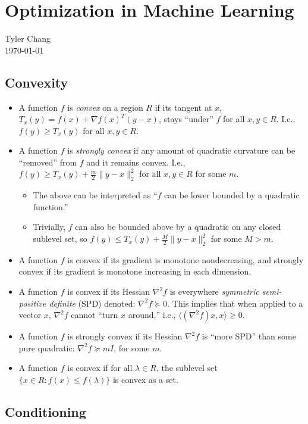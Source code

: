 \documentclass[12pt]{article}
\begin{document}
\section*{Optimization in Machine Learning}
Tyler Chang\\
\today

\subsection*{Convexity}

\begin{itemize}
\item A function $f$ is {\it convex} on a region $R$ if its tangent 
at $x$, $T_x(y)=f(x)+\nabla f(x)^T(y-x)$, stays ``under'' 
$f$ for all $x,y\in R$. I.e., $f(y)\geq T_x(y)$ for all $x,y\in R$.
\item A function $f$ is {\it strongly convex} if any amount of
quadratic curvature can be ``removed'' from $f$ and it remains convex.
I.e., $f(y)\geq T_x(y) + \frac{m}{2}\|y-x\|_2^2$ for all $x,y\in R$
for some $m$.
\begin{itemize}
\item The above can be interpreted as ``$f$ can be lower bounded
by a quadratic function.''
\item Trivially, $f$ can also be bounded above by a quadratic on
any closed sublevel set, so
$f(y)\leq T_x(y) + \frac{M}{2}\|y-x\|_2^2$ for some $M > m$.
\end{itemize}
\item A function $f$ is convex if its gradient is monotone nondecreasing,
and strongly convex if its gradient is monotone increasing in each
dimension.
\item A function $f$ is convex if its Hessian $\nabla^2 f$ is everywhere
{\it symmetric semi-positive definite} (SPD) denoted: 
$\nabla^2 f \succeq 0$.
This implies that when applied to a vector $x$, $\nabla^2 f$ cannot
``turn $x$ around,'' i.e., $\langle (\nabla^2 f) x, x \rangle \geq 0$.
\item A function $f$ is strongly convex if its Hessian $\nabla^2 f$ is 
``more SPD'' than some pure quadratic: $\nabla^2 f \succeq mI$, for some $m$.
\item A function $f$ is convex if for all $\lambda \in R$,
the sublevel set $\{ x \in R : f(x) \leq f(\lambda)\}$ is convex
as a set.
\end{itemize}

\subsection*{Conditioning}
\end{document}
